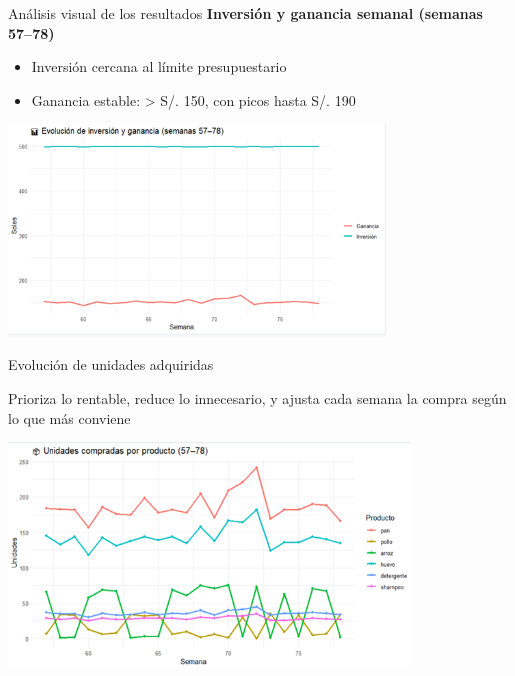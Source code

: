 \documentclass{beamer}
\begin{document}
\begin{frame}{An\'alisis visual de los resultados}
\textbf{Inversi\'on y ganancia semanal (semanas 57--78)}
\begin{itemize}
    \item Inversi\'on cercana al l\'imite presupuestario
    \item Ganancia estable: > S/. 150, con picos hasta S/. 190
\end{itemize}
\vspace{0.3cm}
\includegraphics[width=0.75\textwidth]{Imagen3.png}
\end{frame}

\begin{frame}{Evoluci\'on de unidades adquiridas}
\begin{itemize}
    Prioriza lo rentable, reduce lo innecesario, y ajusta cada semana la compra según lo que más conviene
\end{itemize}
\vspace{0.3cm}
\includegraphics[width=0.8\textwidth]{uproducto1.png}
\end{frame}
\end{document}
